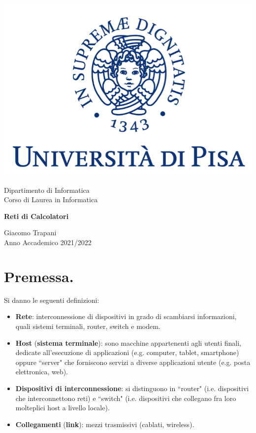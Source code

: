 \documentclass[11pt, italian, openany]{book}
\begin{document}
\begin{sloppypar}
\begin{titlepage}
	\clearpage\thispagestyle{empty}
	\centering
	\vspace{1cm}

    \includegraphics[scale=0.60]{unipi-logo.png}
    
	{\normalsize \noindent Dipartimento di Informatica \\
	             Corso di Laurea in Informatica \par}
	
	\vspace{2cm}
	{\Huge \textbf{Reti di Calcolatori} \par }

    \vspace{4cm}

	{\normalsize Giacomo Trapani \\ Anno Accademico 2021/2022\par}

	\pagebreak

\end{titlepage}
\begingroup
\let\clearpage\relax
\tableofcontents
\listoffigures
\endgroup
\pagebreak
\section*{Premessa.}
Si danno le seguenti definizioni:
\begin{itemize}[topsep=0pt, itemsep=0pt, parsep=0pt]
	\item \textbf{Rete}: interconnessione di dispositivi in grado di scambiarsi informazioni, quali sistemi terminali, router, switch e modem.
	\item \textbf{Host} (\textbf{sistema terminale}): sono macchine appartenenti agli utenti finali, dedicate all'esecuzione di applicazioni (e.g. computer,
	tablet, smartphone) oppure ``server" che forniscono servizi a diverse applicazioni utente (e.g. posta elettronica, web).
	\item \textbf{Dispositivi di interconnessione}: si distinguono in ``router" (i.e. dispositivi che interconnettono reti) e ``switch"
	(i.e. dispositivi che collegano fra loro molteplici host a livello locale).
	\item \textbf{Collegamenti} (\textbf{link}): mezzi trasmissivi (cablati, wireless).
\end{itemize}

\end{sloppypar}
\end{document}
